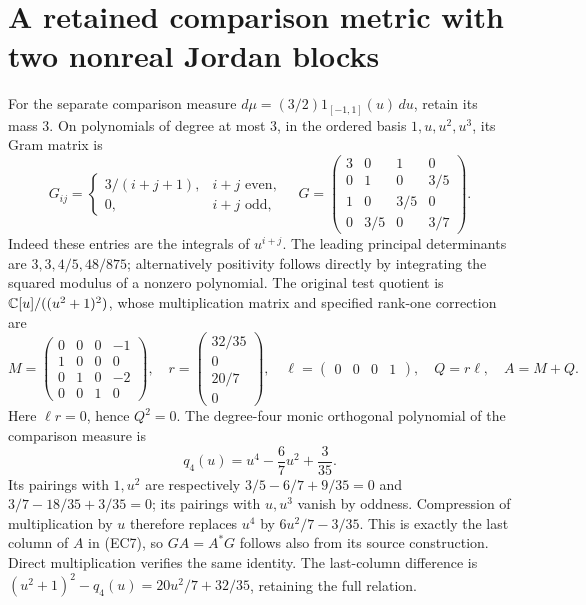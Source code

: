 \documentclass[11pt]{article}
\begin{document}
\section{A retained comparison metric with two nonreal Jordan blocks}

For the separate comparison measure
\(d\mu=(3/2)1_{[-1,1]}(u)\,du\), retain its mass \(3\).
On polynomials of degree at most \(3\), in the ordered basis
\(1,u,u^2,u^3\), its Gram matrix is
\begin{equation}
 G_{ij}=
 \begin{cases}3/(i+j+1),&i+j\text{ even},\\0,&i+j\text{ odd},\end{cases}
 \quad
 G=\begin{pmatrix}
 3&0&1&0\\0&1&0&3/5\\1&0&3/5&0\\0&3/5&0&3/7
 \end{pmatrix}.
 \tag{EC6}
\end{equation}
Indeed these entries are the integrals of \(u^{i+j}\).
The leading principal determinants are
\(3,3,4/5,48/875\); alternatively positivity follows
directly by integrating the squared modulus of a nonzero polynomial.
The original test quotient is \(\mathbb C[u]/((u^2+1)^2)\), whose
multiplication matrix and specified rank-one correction are
\begin{equation}
 M=\begin{pmatrix}
 0&0&0&-1\\1&0&0&0\\0&1&0&-2\\0&0&1&0
 \end{pmatrix},\quad
 r=\begin{pmatrix}32/35\\0\\20/7\\0\end{pmatrix},\quad
 \ell=\begin{pmatrix}0&0&0&1\end{pmatrix},\quad
 Q=r\ell,\quad A=M+Q.
 \tag{EC7}
\end{equation}
Here \(\ell r=0\), hence \(Q^2=0\).
The degree-four monic orthogonal polynomial of the comparison measure is
\[
 q_4(u)=u^4-\frac67u^2+\frac3{35}.
\]
Its pairings with \(1,u^2\) are respectively
\(3/5-6/7+9/35=0\) and
\(3/7-18/35+3/35=0\); its pairings with \(u,u^3\)
vanish by oddness. Compression of multiplication by \(u\)
therefore replaces \(u^4\) by \(6u^2/7-3/35\).
This is exactly the last column of \(A\) in (EC7), so
\(GA=A^*G\) follows also from its source construction.
Direct multiplication verifies the same identity.
The last-column difference is
\((u^2+1)^2-q_4(u)=20u^2/7+32/35\), retaining the full relation.
\end{document}
